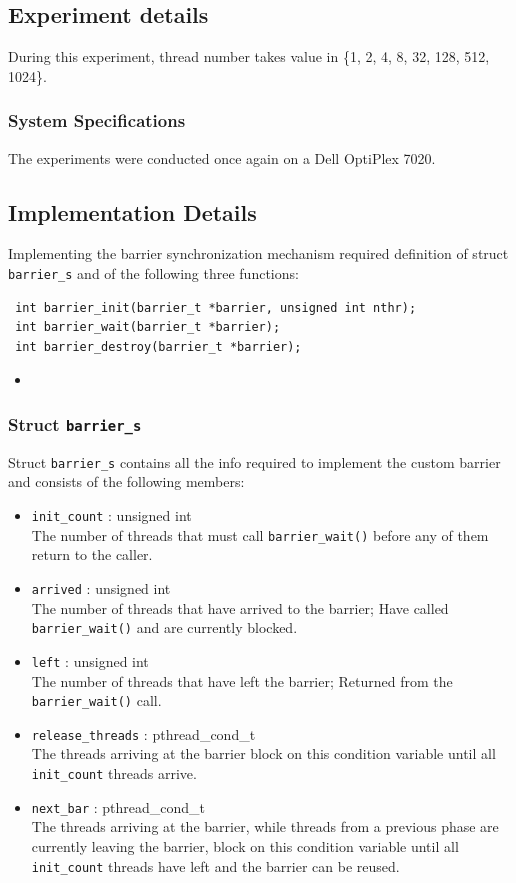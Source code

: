 \documentclass{article}
\newcommand{\cscript}[2]{
\begin{itemize}
\item[]
\end{itemize}
}
\def\code#1{\texttt{#1}}
\begin{document}
\subsection{Experiment details}
During this experiment, thread number takes value in \{1, 2, 4, 8, 32, 128, 512, 1024\}.

\subsubsection{System Specifications}
The experiments were conducted once again on a Dell OptiPlex 7020.

\subsection{Implementation Details}
Implementing the barrier synchronization mechanism required definition of struct
\code{barrier\_s} and of the following three functions:

\begin{verbatim}
 int barrier_init(barrier_t *barrier, unsigned int nthr);
 int barrier_wait(barrier_t *barrier);
 int barrier_destroy(barrier_t *barrier);
\end{verbatim}

\cscript{code/barrier_s}{Struct \code{barrier\_s}}

\subsubsection{Struct \code{barrier\_s}}
Struct \code{barrier\_s} contains all the info required to implement the custom barrier and
consists of the following members:
\begin{itemize}
  \item \code{init\_count} : unsigned int \\
        The number of threads that must call \code{barrier\_wait()} before any of them
        return to the caller.
  \item \code{arrived} : unsigned int \\
        The number of threads that have arrived to the barrier; Have called \code{barrier\_wait()}
        and are currently blocked.
  \item \code{left} : unsigned int \\
        The number of threads that have left the barrier; Returned from the \code{barrier\_wait()}
        call.
  \item \code{release\_threads} : pthread\_cond\_t \\
        The threads arriving at the barrier block on this condition variable until all
        \code{init\_count} threads arrive.
  \item \code{next\_bar} : pthread\_cond\_t \\
        The threads arriving at the barrier, while threads from a previous phase are currently
        leaving the barrier, block on this condition variable until all \code{init\_count}
        threads have left and the barrier can be reused.
\end{itemize}
\end{document}
